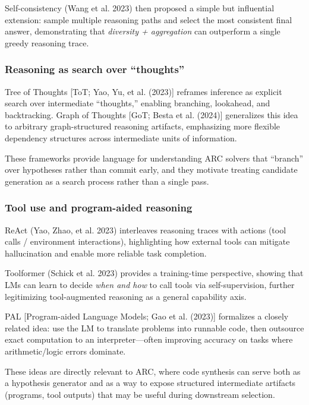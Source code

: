 \documentclass[11pt]{article}
\begin{document}
Self-consistency (Wang et al. 2023) then proposed a simple but
influential extension: sample multiple reasoning paths and select the
most consistent final answer, demonstrating that \emph{diversity +
aggregation} can outperform a single greedy reasoning trace.

\hypertarget{reasoning-as-search-over-thoughts}{%
\subsubsection{Reasoning as search over
``thoughts''}\label{reasoning-as-search-over-thoughts}}

Tree of Thoughts {[}ToT; Yao, Yu, et al. (2023){]} reframes inference as
explicit search over intermediate ``thoughts,'' enabling branching,
lookahead, and backtracking. Graph of Thoughts {[}GoT; Besta et al.
(2024){]} generalizes this idea to arbitrary graph-structured reasoning
artifacts, emphasizing more flexible dependency structures across
intermediate units of information.

These frameworks provide language for understanding ARC solvers that
``branch'' over hypotheses rather than commit early, and they motivate
treating candidate generation as a search process rather than a single
pass.

\hypertarget{tool-use-and-program-aided-reasoning}{%
\subsubsection{Tool use and program-aided
reasoning}\label{tool-use-and-program-aided-reasoning}}

ReAct (Yao, Zhao, et al. 2023) interleaves reasoning traces with actions
(tool calls / environment interactions), highlighting how external tools
can mitigate hallucination and enable more reliable task completion.

Toolformer (Schick et al. 2023) provides a training-time perspective,
showing that LMs can learn to decide \emph{when and how} to call tools
via self-supervision, further legitimizing tool-augmented reasoning as a
general capability axis.

PAL {[}Program-aided Language Models; Gao et al. (2023){]} formalizes a
closely related idea: use the LM to translate problems into runnable
code, then outsource exact computation to an interpreter---often
improving accuracy on tasks where arithmetic/logic errors dominate.

These ideas are directly relevant to ARC, where code synthesis can serve
both as a hypothesis generator and as a way to expose structured
intermediate artifacts (programs, tool outputs) that may be useful
during downstream selection.
\end{document}
